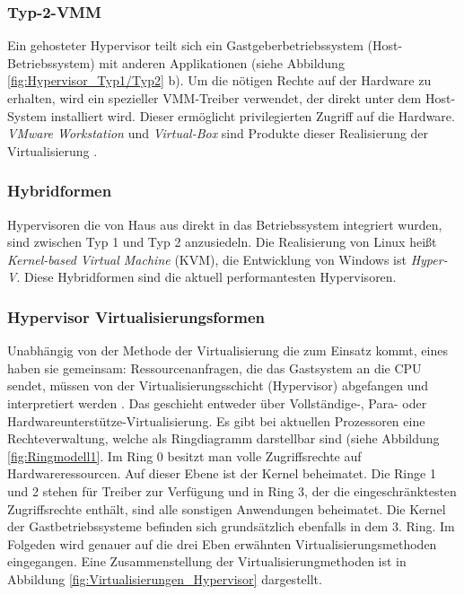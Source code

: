 \subsubsection{Typ-2-VMM}
Ein gehosteter Hypervisor teilt sich ein Gastgeberbetriebssystem (Host-Betriebssystem) mit anderen Applikationen (siehe Abbildung \ref{fig:Hypervisor_Typ1/Typ2} b). Um die nötigen Rechte auf der Hardware zu erhalten, wird ein spezieller VMM-Treiber verwendet, der direkt unter dem Host-System installiert wird. Dieser ermöglicht privilegierten Zugriff auf die Hardware. \emph{VMware Workstation} und \emph{Virtual-Box} sind Produkte dieser Realisierung der Virtualisierung \cite{Glatz2015Betriebssysteme}.

\subsubsection{Hybridformen}
Hypervisoren die von Haus aus direkt in das Betriebssystem integriert wurden, sind zwischen Typ 1 und Typ 2 anzusiedeln. Die Realisierung von Linux heißt \emph{Kernel-based Virtual Machine} (KVM), die Entwicklung von Windows ist \emph{Hyper-V}. Diese Hybridformen sind die aktuell performantesten Hypervisoren. 

\subsubsection{Hypervisor Virtualisierungsformen}
Unabhängig von der Methode der Virtualisierung die zum Einsatz kommt, eines haben sie gemeinsam: Ressourcenanfragen, die das Gastsystem an die CPU sendet, müssen von der Virtualisierungsschicht (Hypervisor) abgefangen und interpretiert werden \cite{Meinel2011VirtualisierungMarktubersicht}. Das geschieht entweder über Vollständige-, Para- oder Hardwareunterstütze-Virtualisierung.  Es gibt bei aktuellen Prozessoren eine Rechteverwaltung, welche als Ringdiagramm darstellbar sind (siehe Abbildung \ref{fig:Ringmodell1}. Im Ring 0 besitzt man volle Zugriffsrechte auf Hardwareressourcen. Auf dieser Ebene ist der Kernel beheimatet. Die Ringe 1 und 2 stehen für Treiber zur Verfügung und in Ring 3, der die eingeschränktesten Zugriffsrechte enthält, sind alle sonstigen Anwendungen beheimatet. Die Kernel der Gastbetriebssysteme befinden sich grundsätzlich ebenfalls in dem 3. Ring. Im Folgeden wird genauer auf die drei Eben erwähnten Virtualisierungsmethoden eingegangen. Eine Zusammenstellung der Virtualisierungmethoden ist in Abbildung \ref{fig:Virtualisierungen_Hypervisor} dargestellt.

